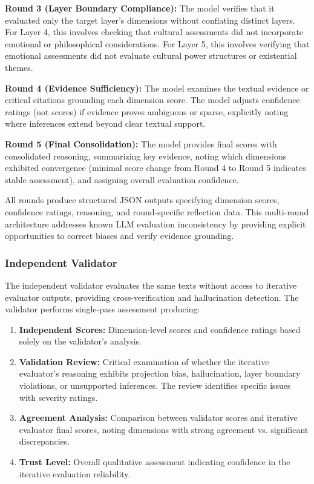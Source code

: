 \textbf{Round 3 (Layer Boundary Compliance):} The model verifies that it evaluated only the target layer's dimensions without conflating distinct layers. For Layer 4, this involves checking that cultural assessments did not incorporate emotional or philosophical considerations. For Layer 5, this involves verifying that emotional assessments did not evaluate cultural power structures or existential themes.

\textbf{Round 4 (Evidence Sufficiency):} The model examines the textual evidence or critical citations grounding each dimension score. The model adjusts confidence ratings (not scores) if evidence proves ambiguous or sparse, explicitly noting where inferences extend beyond clear textual support.

\textbf{Round 5 (Final Consolidation):} The model provides final scores with consolidated reasoning, summarizing key evidence, noting which dimensions exhibited convergence (minimal score change from Round 4 to Round 5 indicates stable assessment), and assigning overall evaluation confidence.

All rounds produce structured JSON outputs specifying dimension scores, confidence ratings, reasoning, and round-specific reflection data. This multi-round architecture addresses known LLM evaluation inconsistency by providing explicit opportunities to correct biases and verify evidence grounding.

\subsubsection{Independent Validator}

The independent validator evaluates the same texts without access to iterative evaluator outputs, providing cross-verification and hallucination detection. The validator performs single-pass assessment producing:

\begin{enumerate}
\item \textbf{Independent Scores:} Dimension-level scores and confidence ratings based solely on the validator's analysis.

\item \textbf{Validation Review:} Critical examination of whether the iterative evaluator's reasoning exhibits projection bias, hallucination, layer boundary violations, or unsupported inferences. The review identifies specific issues with severity ratings.

\item \textbf{Agreement Analysis:} Comparison between validator scores and iterative evaluator final scores, noting dimensions with strong agreement vs. significant discrepancies.

\item \textbf{Trust Level:} Overall qualitative assessment indicating confidence in the iterative evaluation reliability.
\end{enumerate}

